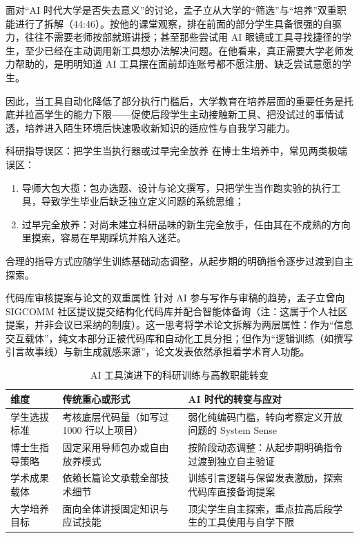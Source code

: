 \documentclass[UTF8,a4paper,11pt,fontset=fandol]{ctexart}
\begin{document}
面对“AI 时代大学是否失去意义”的讨论，孟子立从大学的“筛选”与“培养”双重职能进行了拆解（44:46）。按他的课堂观察，排在前面的部分学生具备很强的自驱力，往往不需要老师按部就班讲授；甚至那些尝试用 AI 眼镜或工具寻找捷径的学生，至少已经在主动调用新工具想办法解决问题。在他看来，真正需要大学老师发力帮助的，是明明知道 AI 工具摆在面前却连账号都不愿注册、缺乏尝试意愿的学生。

因此，当工具自动化降低了部分执行门槛后，大学教育在培养层面的重要任务是托底并拉高学生的能力下限——促使后段学生主动接触新工具、把没试过的事情试透，培养进入陌生环境后快速吸收新知识的适应性与自我学习能力。

\begin{warningbox}{科研指导误区：把学生当执行器或过早完全放养}
在博士生培养中，常见两类极端误区：
\begin{enumerate}
\item 导师大包大揽：包办选题、设计与论文撰写，只把学生当作跑实验的执行工具，导致学生毕业后缺乏独立定义问题的系统思维；
\item 过早完全放养：对尚未建立科研品味的新生完全放手，任由其在不成熟的方向里摸索，容易在早期踩坑并陷入迷茫。
\end{enumerate}
合理的指导方式应随学生训练基础动态调整，从起步期的明确指令逐步过渡到自主探索。
\end{warningbox}
\begin{knowledgebox}{代码库审核提案与论文的双重属性}
针对 AI 参与写作与审稿的趋势，孟子立曾向 SIGCOMM 社区提议提交结构化代码库并配合智能体备询（注：这属于个人社区提案，并非会议已采纳的制度）。这一思考将学术论文拆解为两层属性：作为“信息交互载体”，纯文本部分正被代码库和自动化工具分担；但作为“逻辑训练（如撰写引言故事线）与新生成就感来源”，论文发表依然承担着学术育人功能。
\end{knowledgebox}
\begin{table}[H]\centering\small
\caption{AI 工具演进下的科研训练与高教职能转变}
\begin{tabular}{>{\raggedright\arraybackslash}p{\dimexpr(\linewidth-6\tabcolsep)/3\relax}>{\raggedright\arraybackslash}p{\dimexpr(\linewidth-6\tabcolsep)/3\relax}>{\raggedright\arraybackslash}p{\dimexpr(\linewidth-6\tabcolsep)/3\relax}}
\toprule
维度 & 传统重心或形式 & AI 时代的转变与应对\\\midrule
学生选拔标准 & 考核底层代码量（如写过 1000 行以上项目） & 弱化纯编码门槛，转向考察定义开放问题的 System Sense\\[4pt]
博士生指导策略 & 固定采用导师包办或自由放养模式 & 按阶段动态调整：从起步期明确指令过渡到独立自主验证\\[4pt]
学术成果载体 & 依赖长篇论文承载全部技术细节 & 训练引言逻辑与保留发表激励，探索代码库直接备询提案\\[4pt]
大学培养目标 & 面向全体讲授固定知识与应试技能 & 顶尖学生自主探索，重点拉高后段学生的工具使用与自学下限\\[4pt]
\bottomrule\end{tabular}\end{table}
\end{document}
